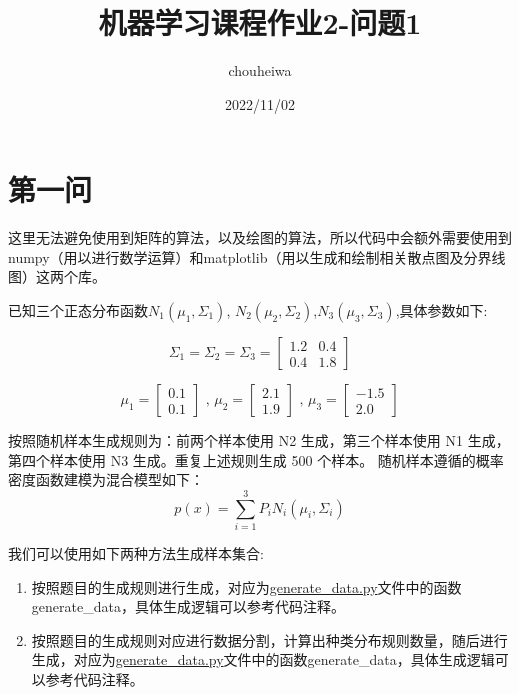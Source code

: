 \documentclass[UTF8]{article} %
\title{机器学习课程作业2-问题1}
\author{chouheiwa}
\date{2022/11/02}
\begin{document}
    \maketitle
    \tableofcontents


    \section{第一问}
    这里无法避免使用到矩阵的算法，以及绘图的算法，所以代码中会额外需要使用到numpy（用以进行数学运算）和matplotlib（用以生成和绘制相关散点图及分界线图）这两个库。

    已知三个正态分布函数$N_1(\mu_1, \Sigma_1)$, $N_2(\mu_2, \Sigma_2)$,$N_3(\mu_3, \Sigma_3)$,具体参数如下:

    \[
        \Sigma_1 = \Sigma_2 = \Sigma_3 = \left[
            \begin{matrix}
                1.2 & 0.4 \\
                0.4 & 1.8
            \end{matrix}
            \right]
    \]

    \[
        \mu_1 =  \left[
            \begin{matrix}
                0.1 \\
                0.1
            \end{matrix}
            \right]\text{ , }
        \mu_2 =  \left[
            \begin{matrix}
                2.1 \\
                1.9
            \end{matrix}
            \right]\text{ , }
        \mu_3 = \left[
            \begin{matrix}
                -1.5 \\
                2.0
            \end{matrix}
            \right]
    \]

    按照随机样本生成规则为：前两个样本使用 N2 生成，第三个样本使用 N1 生成，第四个样本使用 N3 生成。重复上述规则生成 500 个样本。
    随机样本遵循的概率密度函数建模为混合模型如下：
    \[
        p(x) = \sum_{i=1}^3 P_i N_i(\mu_i, \Sigma_i)
    \]

    我们可以使用如下两种方法生成样本集合:
    \begin{enumerate}
        \item 按照题目的生成规则进行生成，对应为\href{run:generate_data.py}{generate\_data.py}文件中的函数generate\_data，具体生成逻辑可以参考代码注释。
        \item 按照题目的生成规则对应进行数据分割，计算出种类分布规则数量，随后进行生成，对应为\href{run:generate_data.py}{generate\_data.py}文件中的函数generate\_data，具体生成逻辑可以参考代码注释。
    \end{enumerate}
\end{document}
